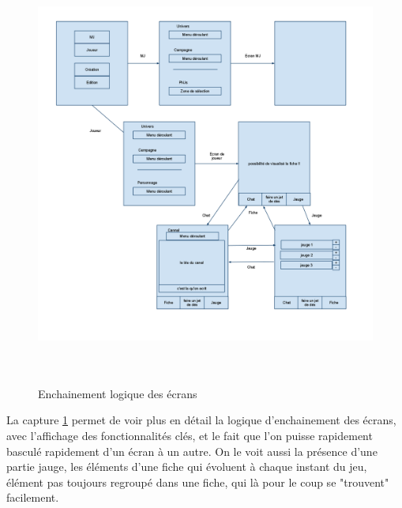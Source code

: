\documentclass[11pt,a4paper]{article}
\begin{document}
\begin{figure}[h]
  	
  		\includegraphics[height=14cm,width=15cm]{image/screen2.png}
  		\caption{Enchainement logique des écrans}
  		\label{screen2}
\end{figure}

La capture \ref{screen2} permet de voir plus en détail la logique d'enchainement des écrans, 
avec l'affichage des fonctionnalités clés, et le fait que l'on puisse rapidement basculé rapidement d'un écran à un autre.
On le voit aussi la présence d'une partie jauge, les éléments d'une fiche qui évoluent à chaque instant du jeu, 
élément pas toujours regroupé dans une fiche, qui là pour le coup se "trouvent" facilement. 
\end{document}
